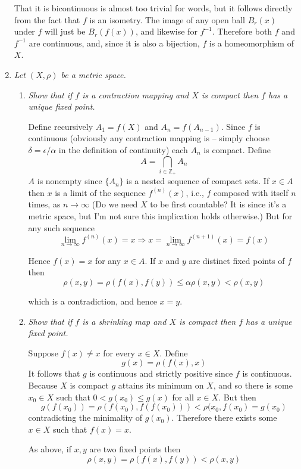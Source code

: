 \documentclass[10pt]{article}
\newcommand{\Z}{\mathbb{Z}}
\begin{document}
\begin{enumerate}
That it is bicontinuous is almost too trivial for words, but it follows directly from the fact that $f$ is an isometry.  The image of any open ball $B_r(x)$ under $f$ will just be $B_r(f(x))$, and likewise for $f^{-1}$.  Therefore both $f$ and $f^{-1}$ are continuous, and, since it is also a bijection, $f$ is a homeomorphism of $X$.

\item \emph{Let $(X, \rho)$ be a metric space.}
\begin{enumerate}
\item \emph{Show that if $f$ is a contraction mapping and $X$ is compact then $f$ has a unique fixed point.}

Define recursively $A_1 = f(X)$ and $A_n = f(A_{n-1})$.  Since $f$ is continuous (obviously any contraction mapping is -- simply choose $\delta = \epsilon / \alpha$ in the definition of continuity) each $A_n$ is compact.  Define $$A = \bigcap_{i \in \Z_+} A_n$$ $A$ is nonempty since $\{A_n\}$ is a nested sequence of compact sets.  If $x \in A$ then $x$ is a limit of the sequence $f^{(n)}(x)$, i.e., $f$ composed with itself $n$ times, as $n \rightarrow \infty$ (Do we need $X$ to be first countable?  It is since it's a metric space, but I'm not sure this implication holds otherwise.)  But for any such sequence
\[
\lim_{n\rightarrow\infty} f^{(n)}(x) = x \Rightarrow x = \lim_{n\rightarrow\infty} f^{(n+1)}(x) = f(x)
\]

Hence $f(x) = x$ for any $x \in A$.  If $x$ and $y$ are distinct fixed points of $f$ then
\[
\rho(x,y) = \rho(f(x), f(y)) \leq \alpha \rho(x,y) < \rho(x,y)
\]

which is a contradiction, and hence $x = y$.

\item \emph{Show that if $f$ is a shrinking map and $X$ is compact then $f$ has a unique fixed point.}

Suppose $f(x) \neq x$ for every $x \in X$.  Define $$g(x) = \rho(f(x), x)$$  It follows that $g$ is continuous and strictly positive since $f$ is continuous.  Because $X$ is compact $g$ attains its minimum on $X$, and so there is some $x_0 \in X$ such that $0 < g(x_0) \leq g(x)$ for all $x \in X$.  But then $$g(f(x_0)) = \rho(f(x_0), f(f(x_0))) < \rho(x_0, f(x_0) = g(x_0)$$ contradicting the minimality of $g(x_0)$.  Therefore there exists some $x \in X$ such that $f(x) = x$.

As above, if $x,y$ are two fixed points then
\[
\rho(x,y) = \rho(f(x), f(y)) < \rho(x,y)
\]


\end{enumerate}
\end{enumerate}
\end{document}
